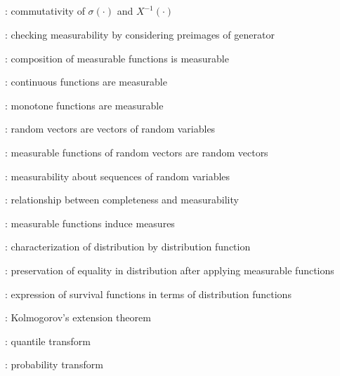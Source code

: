 \subsection*{}
\item {}: commutativity of \(\sigma(\cdot)\) and \(X^{-1}(\cdot)\)
\item {}: checking measurability by
considering preimages of generator
\item {}: composition of measurable functions is
measurable
\item {}: continuous functions are measurable
\item {}: monotone functions are measurable
\item {}: random vectors are vectors of random variables
\item {}: measurable functions of random vectors are random vectors
\item {}: measurability about sequences of random variables
\item {}: relationship between completeness and
measurability
\item {}: measurable functions induce measures
\item {}: characterization of distribution by distribution function
\item {}: preservation of equality in distribution after applying
measurable functions
\item {}: expression of survival functions in terms of distribution functions
\item {}: Kolmogorov's extension theorem
\item {}: quantile transform
\item {}: probability transform
